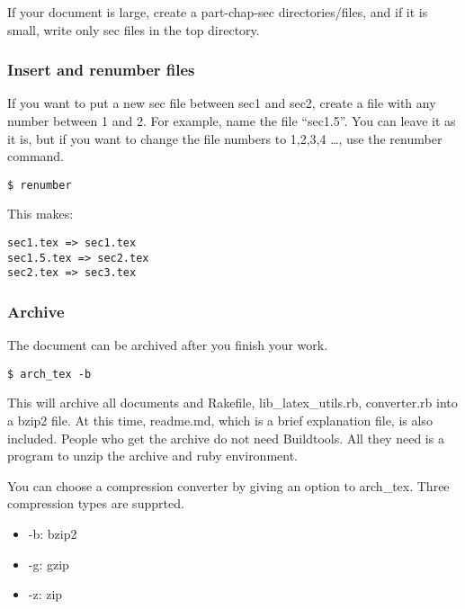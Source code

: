\documentclass[
]{article}
\providecommand{\tightlist}{%
  \setlength{\itemsep}{0pt}\setlength{\parskip}{0pt}}
\begin{document}
If your document is large, create a part-chap-sec directories/files, and
if it is small, write only sec files in the top directory.

\hypertarget{insert-and-renumber-files}{%
\subsubsection{Insert and renumber
files}\label{insert-and-renumber-files}}

If you want to put a new sec file between sec1 and sec2, create a file
with any number between 1 and 2. For example, name the file ``sec1.5''.
You can leave it as it is, but if you want to change the file numbers to
1,2,3,4 \ldots, use the renumber command.

\begin{verbatim}
$ renumber
\end{verbatim}

This makes:

\begin{verbatim}
sec1.tex => sec1.tex
sec1.5.tex => sec2.tex
sec2.tex => sec3.tex
\end{verbatim}

\hypertarget{archive}{%
\subsubsection{Archive}\label{archive}}

The document can be archived after you finish your work.

\begin{verbatim}
$ arch_tex -b
\end{verbatim}

This will archive all documents and Rakefile, lib\_latex\_utils.rb,
converter.rb into a bzip2 file. At this time, readme.md, which is a
brief explanation file, is also included. People who get the archive do
not need Buildtools. All they need is a program to unzip the archive and
ruby \hspace{0pt}\hspace{0pt}environment.

You can choose a compression converter by giving an option to arch\_tex.
Three compression types are supprted.

\begin{itemize}
\tightlist
\item
  -b: bzip2
\item
  -g: gzip
\item
  -z: zip
\end{itemize}
\end{document}
